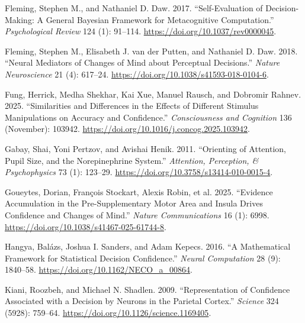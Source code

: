 \documentclass[
]{article}
\newlength{\cslhangindent}
\newenvironment{CSLReferences}[2] %
 {\begin{list}{}{%
  \setlength{\itemindent}{0pt}
  \setlength{\leftmargin}{0pt}
  \setlength{\parsep}{0pt}
  \ifodd #1
   \setlength{\leftmargin}{\cslhangindent}
   \setlength{\itemindent}{-1\cslhangindent}
  \fi
  \setlength{\itemsep}{#2\baselineskip}}}
 {\end{list}}
\begin{document}
\begin{CSLReferences}{1}{1}
Fleming, Stephen M., and Nathaniel D. Daw. 2017. {``Self-{Evaluation} of
{Decision-Making}: {A General Bayesian Framework} for {Metacognitive
Computation}.''} \emph{Psychological Review} 124 (1): 91--114.
\url{https://doi.org/10.1037/rev0000045}.

Fleming, Stephen M., Elisabeth J. van der Putten, and Nathaniel D. Daw.
2018. {``Neural Mediators of Changes of Mind about Perceptual
Decisions.''} \emph{Nature Neuroscience} 21 (4): 617--24.
\url{https://doi.org/10.1038/s41593-018-0104-6}.

Fung, Herrick, Medha Shekhar, Kai Xue, Manuel Rausch, and Dobromir
Rahnev. 2025. {``Similarities and Differences in the Effects of
Different Stimulus Manipulations on Accuracy and Confidence.''}
\emph{Consciousness and Cognition} 136 (November): 103942.
\url{https://doi.org/10.1016/j.concog.2025.103942}.

Gabay, Shai, Yoni Pertzov, and Avishai Henik. 2011. {``Orienting of
Attention, Pupil Size, and the Norepinephrine System.''}
\emph{Attention, Perception, \& Psychophysics} 73 (1): 123--29.
\url{https://doi.org/10.3758/s13414-010-0015-4}.

Goueytes, Dorian, François Stockart, Alexis Robin, et al. 2025.
{``Evidence Accumulation in the Pre-Supplementary Motor Area and Insula
Drives Confidence and Changes of Mind.''} \emph{Nature Communications}
16 (1): 6998. \url{https://doi.org/10.1038/s41467-025-61744-8}.

Hangya, Balázs, Joshua I. Sanders, and Adam Kepecs. 2016. {``A
{Mathematical Framework} for {Statistical Decision Confidence}.''}
\emph{Neural Computation} 28 (9): 1840--58.
\url{https://doi.org/10.1162/NECO_a_00864}.

Kiani, Roozbeh, and Michael N. Shadlen. 2009. {``Representation of
{Confidence Associated} with a {Decision} by {Neurons} in the {Parietal
Cortex}.''} \emph{Science} 324 (5928): 759--64.
\url{https://doi.org/10.1126/science.1169405}.


\end{CSLReferences}
\end{document}
